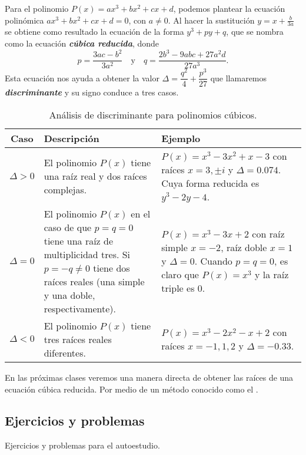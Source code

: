 Para el polinomio $P(x) = ax^3 + bx^2 + cx + d$, podemos plantear la ecuación polinómica $ax^3 + bx^2 + cx + d = 0$, con $a \neq 0$.
Al hacer la sustitución $y = x + \frac{b}{3a}$ se obtiene como resultado la ecuación de la forma $y^3 + py + q$, que se nombra como la ecuación \textbf{\emph{cúbica reducida}}, donde
\[
    p = \frac{3ac - b^2}{3a^2}\quad\text{y}\quad q = \frac{2b^3 - 9abc + 27a^2 d}{27a^3}.
\]
Esta ecuación nos ayuda a obtener la valor $\Delta = \dfrac{q^2}{4} + \dfrac{p^3}{27}$ que llamaremos \textbf{\emph{discriminante}} y su signo conduce a tres casos.
\begin{table}[H]
    \centering
    \begin{tabular}{| c | p{6.5cm} | p{6.5cm} |}
        \hline
        Caso & Descripción & Ejemplo \\ \hline
        $\Delta > 0$ & El polinomio $P(x)$ tiene una raíz real y dos raíces complejas.&
            $P(x) = x^3 - 3x^2 + x - 3$ con raíces $x = 3, \pm i$ y $\Delta = 0.074$.
            Cuya forma reducida es $y^3 - 2y - 4$. \\\hline
        $\Delta = 0$ & El polinomio $P(x)$ en el caso de que $p = q = 0$ tiene una raíz de multiplicidad tres.
        Si $p = -q \neq 0$ tiene dos raíces reales (una simple y una doble, respectivamente).&
            $P(x) = x^3 - 3x + 2$ con raíz simple $x = -2$, raíz doble $x = 1$ y $\Delta = 0$.
            Cuando $p = q = 0$, es claro que $P(x) = x^3$ y la raíz triple es 0.\\\hline
        $\Delta < 0$ & El polinomio $P(x)$ tiene tres raíces reales diferentes.&
            $P(x) = x^3 - 2x^2 - x + 2$ con raíces $x = -1, 1, 2$ y $\Delta = -0.33$. \\\hline
    \end{tabular}
    \caption{Análisis de discriminante para polinomios cúbicos.}
    \label{tab:table}
\end{table}

En las próximas clases veremos una manera directa de obtener las raíces de una ecuación cúbica reducida.
Por medio de un método conocido como el .



\subsection{Ejercicios y problemas}

Ejercicios y problemas para el autoestudio.

\showLine

